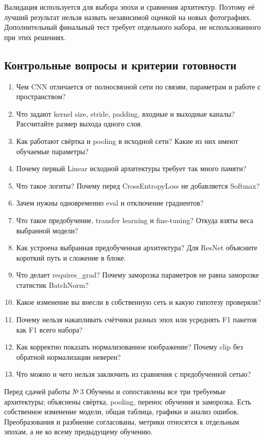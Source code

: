 Валидация используется для выбора эпохи и сравнения архитектур. Поэтому её лучший результат нельзя назвать независимой оценкой на новых фотографиях. Дополнительный финальный тест требует отдельного набора, не использованного при этих решениях.

\subsection{Контрольные вопросы и критерии готовности}
\begin{enumerate}
\item Чем CNN отличается от полносвязной сети по связям, параметрам и работе с пространством?
\item Что задают kernel size, stride, padding, входные и выходные каналы? Рассчитайте размер выхода одного слоя.
\item Как работают свёртка и pooling в исходной сети? Какие из них имеют обучаемые параметры?
\item Почему первый Linear исходной архитектуры требует так много памяти?
\item Что такое логиты? Почему перед CrossEntropyLoss не добавляется Softmax?
\item Зачем нужны одновременно eval и отключение градиентов?
\item Что такое предобучение, transfer learning и fine-tuning? Откуда взяты веса выбранной модели?
\item Как устроена выбранная предобученная архитектура? Для ResNet объясните короткий путь и сложение в блоке.
\item Что делает requires\_grad? Почему заморозка параметров не равна заморозке статистик BatchNorm?
\item Какое изменение вы внесли в собственную сеть и какую гипотезу проверяли?
\item Почему нельзя накапливать счётчики разных эпох или усреднять F1 пакетов как F1 всего набора?
\item Как корректно показать нормализованное изображение? Почему clip без обратной нормализации неверен?
\item Что можно и чего нельзя заключить из сравнения с предобученной сетью?
\end{enumerate}

\begin{keybox}{Перед сдачей работы №\,3}
Обучены и сопоставлены все три требуемые архитектуры; объяснены свёртка, pooling, перенос обучения и заморозка. Есть собственное изменение модели, общая таблица, графики и анализ ошибок. Преобразования и разбиение согласованы, метрики относятся к отдельным эпохам, а не ко всему предыдущему обучению.
\end{keybox}

